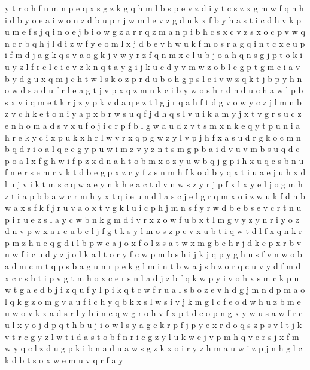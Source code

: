 \documentclass{article}
\begin{document}
y t r o h f u m n p e q x s g z
k g q h m l b s p e v z d i y t
c s z x g m w f q n h i d b y o e a
i w o n z d b u
p r j w m l e v z g d n k x f b y h a s t i c
d h v k p u m e f s j q i n o
e j b i o w g z a r
r q z m a n p i b h c
s x c v
z s x o c p v w q
n c r b q h j l d i z w f y e o m
l x j d b e v h w u k f m o s r a g q i n t
c x e u p i f m d j a g k q s v
a o g k j v w y r z f q n m x c l u
b j o
a h q n s g j p t o k i u y z l f r c
l e i c v z k n q t a y g
i j k u c d y v m w z o b l e g p t
g m
e i a v b y d g u x q m j c h t w l s k o z p
r
d u b o h g p s l e i v w
z q k t j b p y h n o w d s a
d u f r l e a g t j v p x q z m n k c i b y w o s h
r d
n d u c h a w l p b s x v i q m e t k r j z y
p k v d a q e z t l g j
r q a h f t d g v o w y c z j l m n b
z v c h k e t o n i y a p x b r w s u q f j d
h q s l v u i k a m y
j x t v g r s u c z e n h o m
a d s v x u f
o j i c r p f b l g w a u d z v t s m x n k e q y
t p u n i a h r e k y c
i x
p u k x h r l
w v r x q p
g
w z y l v p j h f x a s u d r g k o c m n b q
d r i o a l q c e g y p u w
i m z v
y z n t s m g p b a i d v u
v m b s u q d c p o a l x f g h w
i f p z x d n a h t o b m
x o z y u w b q j g p
i h x u q c s b n
u f n e
r s e
m r v k t d b e g p x z c y f
z s n m h f k o d b y q x t i u a e j
u
h x d l u j v i k t m s c q w a e y n
k h e a c t d v n w s z y r j p f x l
x y e l j o g m h z t i a
p b
b a w c r m h y x t q i e u n d l
a s c j e l g r q m x o i z w u k f d n b
w a x s f
k f j r u v
a o x t v g k l u i c p h j m n s f y r w d b e
b s
e v c r
t n
u p i r
u e z s l a y c w b n k g m d i v r x
z o w f u b x t l m g v y
z y n
r
i y o z d n v p w x a r c u b e l j f g t k s
y l m o s z p e v x u b t i q w
t d l f x q n k r p
m z h u e q g d i l b p w c a j o x
f o l z s a t w x m g b e h r j d k
e p x r b v n w f i c u d y z j o l
k a l t o r y f c w p m b s h i
j
k j q p y g h u s f v n w o b a d m c
m t q p s b a g u n r
p e k g l m i n t b w a j s h z o r q c u v y d f
m d x c r s h
t i p
v g t m h o x c e r s n l a d j z b f q k w p y i
v o h x s m c k p n w t g a e d b j i z q u f y l
p i k q t c w f r u a l s b o z e v h d g j m n
d p m a o l q k g
z o m g v a u f i c h y q b k x s l w
s i v j k m g l c f e o d w h u z b
m e u w o v k x a d s r l y b i
n c q w g r o h v f x p t
d e o p n g x y
w
u
s a w f r c u l x y o j d p q t h b
u j i o w l s y a g e k r p
f j p y e x r d o q s z
p s v l t j k
v t r c g y z l w
t i
d a s t o b f n r i c g z y l u k w e j v p m h q
v e r s j x f m w y q c l z d u g p k i b n a
d u a w s g z k x o i r y
z h m a u w
i z p j n h g l c k d b t s o x w e m u v q r f a y
\end{document}
